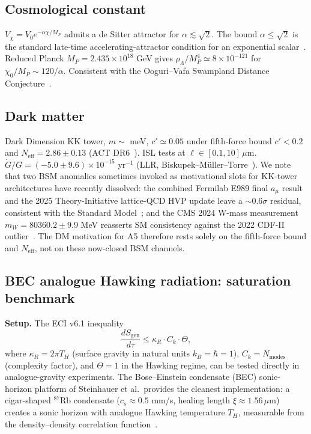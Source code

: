 \documentclass[reprint,amsmath,amssymb,aps,prd,superscriptaddress]{revtex4-2}
\providecommand{\1}{\mathbf{1}}
\begin{document}
\subsection{Cosmological constant}
$V_\chi = V_0 e^{-\alpha \chi / M_P}$ admits a de Sitter attractor for $\alpha \lesssim \sqrt{2}$. The bound $\alpha \le \sqrt{2}$ is the standard late-time accelerating-attractor condition for an exponential scalar~\cite{Halliwell1987,CopelandLiddleWands1998}.
Reduced Planck $M_P = 2.435 \times 10^{18}$ GeV gives $\rho_\Lambda / M_P^4 \simeq 8 \times 10^{-121}$ for $\chi_0 / M_P \sim 120/\alpha$. Consistent with the Ooguri--Vafa Swampland Distance Conjecture~\cite{OoguriVafa2007}.

\subsection{Dark matter}
Dark Dimension KK tower, $m \sim$ meV, $c' \simeq 0.05$ under fifth-force bound $c' < 0.2$ and $N_{\mathrm{eff}} = 2.86 \pm 0.13$ (ACT DR6~\cite{Calabrese2025}). ISL tests at $\ell \in [0.1, 10] \, \mu$m. $\dot G / G = (-5.0 \pm 9.6) \times 10^{-15}$ yr$^{-1}$ (LLR, Biskupek--M\"uller--Torre~\cite{Biskupek2021}). We note that two BSM anomalies sometimes invoked as motivational slots for KK-tower architectures have recently dissolved: the combined Fermilab E989 final $a_\mu$ result and the 2025 Theory-Initiative lattice-QCD HVP update leave a $\sim 0.6\sigma$ residual, consistent with the Standard Model~\cite{MuonG2Final2025}; and the CMS 2024 W-mass measurement $m_W = 80360.2 \pm 9.9$ MeV reasserts SM consistency against the 2022 CDF-II outlier~\cite{CMSWmass2024}. The DM motivation for A5 therefore rests solely on the fifth-force bound and $N_{\mathrm{eff}}$, not on these now-closed BSM channels.







\subsection{BEC analogue Hawking radiation: saturation benchmark}
\label{sec:bec-analogue}

\noindent\textbf{Setup.}
The ECI v6.1 inequality
\begin{equation}
  \frac{dS_\mathrm{gen}}{d\tau} \leq \kappa_R \cdot C_k \cdot \Theta,
  \label{eq:eci-ineq}
\end{equation}
where $\kappa_R = 2\pi T_H$ (surface gravity in natural units $k_B = \hbar = 1$),
$C_k = N_\mathrm{modes}$ (complexity factor), and $\Theta = 1$ in the Hawking regime,
can be tested directly in analogue-gravity experiments.
The Bose--Einstein condensate (BEC) sonic-horizon platform of Steinhauer et al.\
provides the cleanest implementation: a cigar-shaped $^{87}$Rb condensate
($c_s \approx 0.5$ mm/s, healing length $\xi \approx 1.56\,\mu$m) creates
a sonic horizon with analogue Hawking temperature $T_H$, measurable from the
density--density correlation function~\cite{Steinhauer2016,Steinhauer2019,Kolobov2021}.
\end{document}
